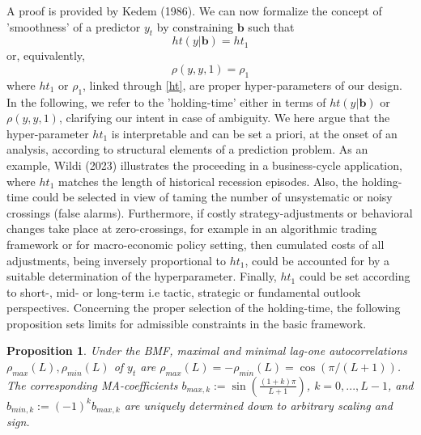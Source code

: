 \documentclass[a4paper]{article}
\newtheorem{Proposition}{Proposition}
\begin{document}
A proof is provided by Kedem (1986). We can now formalize the concept of 'smoothness' of a predictor $y_t$ by constraining $\mathbf{b}$ such that
\begin{equation}\label{ht_const}
ht(y|\mathbf{b})= ht_1
\end{equation}
or, equivalently,
\begin{equation}\label{ht_const_z}
\rho(y,y,1)= \rho_1
\end{equation}
where $ht_1$ or $\rho_1$, linked through \ref{ht}, are proper hyper-parameters of our design. In the following, we  refer to the 'holding-time' either in terms of $ht(y|\mathbf{b})$ or $\rho(y,y,1)$, clarifying our intent in case of ambiguity. We here argue that the hyper-parameter $ht_1$ is interpretable and can be set a priori, at the onset of an analysis, according to structural elements of a prediction problem. As an example, Wildi (2023) illustrates the proceeding in a business-cycle application, where $ht_1$ matches the length of historical recession episodes. Also, the holding-time could be selected in view of taming the number of unsystematic or noisy crossings (false alarms). Furthermore, if costly strategy-adjustments or behavioral changes take place at zero-crossings, for example in an algorithmic trading framework or for macro-economic policy setting, then cumulated costs of all adjustments, being inversely proportional to $ht_1$, could be  accounted for by a suitable determination of the hyperparameter. Finally, $ht_1$ could be set according to short-, mid- or long-term i.e tactic, strategic or fundamental outlook perspectives. Concerning the proper selection of the holding-time, the following proposition sets limits for admissible constraints in the basic framework.

\begin{Proposition}\label{maxrho}
Under the BMF, maximal and minimal lag-one autocorrelations $\rho_{max}(L),\rho_{min}(L)$ of $y_t$ are $ \rho_{max}(L)=-\rho_{min}(L)=\cos(\pi/(L+1))$. The corresponding MA-coefficients $b_{max,k}:=\sin\left(\displaystyle{\frac{(1+k)\pi}{L+1}}\right)$, $k=0,...,L-1$, and $b_{min,k}:=(-1)^kb_{max,k}$ are uniquely determined down to arbitrary scaling and sign.  
\end{Proposition}
\end{document}
